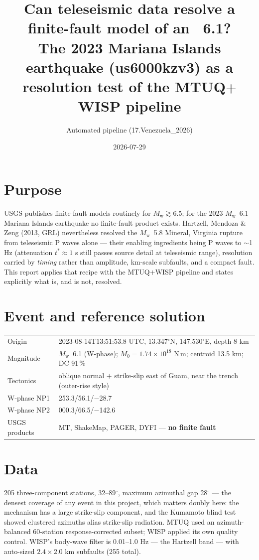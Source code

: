 \documentclass[11pt]{article}
\title{\textbf{Can teleseismic data resolve a finite-fault model of an \Mw~6.1?}\\
\large The 2023 Mariana Islands earthquake (us6000kzv3) as a resolution test of the
MTUQ$+$WISP pipeline}
\author{Automated pipeline (17.Venezuela\_2026)}
\date{2026-07-29}
\newcommand{\Mw}{$M_{\mathrm w}$}
\begin{document}
\maketitle

\section*{Purpose}
USGS publishes finite-fault models routinely for \Mw$\gtrsim$6.5; for the 2023 \Mw~6.1 Mariana
Islands earthquake no finite-fault product exists. Hartzell, Mendoza \& Zeng (2013, GRL)
nevertheless resolved the \Mw~5.8 Mineral, Virginia rupture from teleseismic P waves alone ---
their enabling ingredients being P waves to $\sim$1 Hz (attenuation $t^*\!\approx\!1$ s still
passes source detail at teleseismic range), resolution carried by \emph{timing} rather than
amplitude, km-scale subfaults, and a compact fault. This report applies that recipe with the
MTUQ$+$WISP pipeline and states explicitly what is, and is not, resolved.

\section{Event and reference solution}
\begin{table}[H]\centering\small
\begin{tabular}{ll}
\toprule
Origin & 2023-08-14T13:51:53.8 UTC, 13.347$^\circ$N, 147.530$^\circ$E, depth 8 km \\
Magnitude & \Mw~6.1 (W-phase); $M_0=1.74\times10^{18}$ N\,m; centroid 13.5 km; DC 91\,\% \\
Tectonics & oblique normal $+$ strike-slip east of Guam, near the trench (outer-rise style) \\
W-phase NP1 & 253.3/56.1/$-$28.7 \\
W-phase NP2 & 000.3/66.5/$-$142.6 \\
USGS products & MT, ShakeMap, PAGER, DYFI --- \textbf{no finite fault} \\
\bottomrule
\end{tabular}
\end{table}

\section{Data}
205 three-component stations, 32--89$^\circ$, maximum azimuthal gap 28$^\circ$ --- the densest
coverage of any event in this project, which matters doubly here: the mechanism has a large
strike-slip component, and the Kumamoto blind test showed clustered azimuths alias strike-slip
radiation. MTUQ used an azimuth-balanced 60-station response-corrected subset; WISP applied its
own quality control. WISP's body-wave filter is 0.01--1.0 Hz --- the Hartzell band --- with
auto-sized $2.4\times2.0$ km subfaults (255 total).
\end{document}
